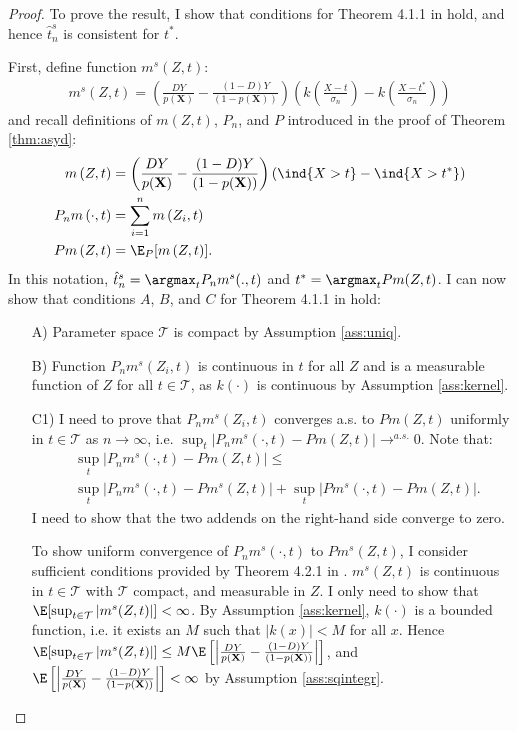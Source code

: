 {\begin{proof}
To prove the result, I show that conditions for Theorem 4.1.1 in \cite{amemiya1985advanced} hold, and hence $\hat{t}^s_n$ is consistent for $t^*$.

First, define function $m^s(Z,t)$:
\begin{gather*}
    m^s \left(Z, t\right)=\left(\frac{D Y}{p(\textbf{X})} - \frac{(1-D) Y}{(1-p(\textbf{X}))} \right) \left(k\left(\frac{X - t}{\sigma_n} \right) - k\left(\frac{X - t^*}{\sigma_n} \right) \right)
\end{gather*}
and recall definitions of $m(Z,t)$, $P_n$, and $P$ introduced in the proof of Theorem \ref{thm:asyd}:
\begin{align}
    m\left(Z, t\right) &=\left(\frac{D Y}{p(\textbf{X})} - \frac{(1-D) Y}{(1-p(\textbf{X}))} \right) \left(\ind\{X > t\} - \ind\{X > t^*\} \right) \\
    P_n m\left(\cdot, t\right) &= \sum_{i=1}^n m\left(Z_i, t\right) \\
    P m\left(Z, t\right) &= \E_P[ m\left(Z, t\right)].
\end{align}
In this notation, $\hat{t}^s_n = \argmax_{t} P_n m^s (.,t)$ and $t^* = \argmax_{t} P m (Z,t)$. I can now show that conditions $A$, $B$, and $C$ for Theorem 4.1.1 in \cite{amemiya1985advanced} hold:

\begin{itemize}
\item[A)] Parameter space $\mathcal{T}$ is compact by Assumption \ref{ass:uniq}.
\item[B)] Function $P_n m^s \left(Z_i, t\right)$ is continuous in $t$ for all $Z$ and is a measurable function of $Z$ for all $t \in \mathcal{T}$, as $k(\cdot)$ is continuous by Assumption \ref{ass:kernel}.
\item[C1)] I need to prove that $P_n m^s \left(Z_i, t\right)$ converges a.s. to $P m(Z,t)$ uniformly in $t \in \mathcal{T}$ as $n \rightarrow \infty$, i.e. $\sup _t\left|P_n m^s(\cdot, t)-P m(Z, t)\right| \rightarrow^{a.s.} 0$. Note that:
\begin{align}
    & \sup _t\left|P_n m^s(\cdot, t)-P m(Z, t)\right| \leq  \\
   & \sup _t\left|P_n m^s(\cdot, t)-P m^s(Z, t)\right| + \sup _t\left|P m^s(\cdot, t)-P m(Z, t)\right|.
\end{align}
I need to show that the two addends on the right-hand side converge to zero.

To show uniform convergence of $P_n m^s(\cdot, t)$ to $P m^s(Z, t)$, I consider sufficient conditions provided by Theorem 4.2.1 in \cite{amemiya1985advanced}. $m^s(Z,t)$ is continuous in $t\in \mathcal{T}$ with $\mathcal{T}$ compact, and measurable in $Z$. I only need to show that $\E[\sup_{t \in \mathcal{T}}|m^s(Z,t)|]<\infty$. By Assumption \ref{ass:kernel}, $k(\cdot)$ is a bounded function, i.e. it exists an $M$ such that $|k(x)|<M$ for all $x$. Hence $\E[\sup_{t \in \mathcal{T}}|m^s(Z,t)|]\leq M \E\left[\left|\frac{D Y}{p(\textbf{X})} - \frac{(1-D) Y}{(1-p(\textbf{X}))} \right|\right]$, and $\E\left[\left|\frac{D Y}{p(\textbf{X})} - \frac{(1-D) Y}{(1-p(\textbf{X}))} \right|\right]< \infty$ by Assumption \ref{ass:sqintegr}.


\end{itemize}
\end{proof}}
